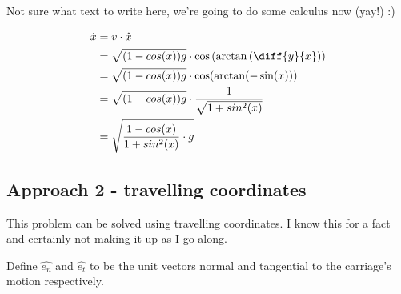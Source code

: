 \documentclass{article}
\begin{document}
Not sure what text to write here, we're going to do some calculus now (yay!) :)

\begin{align}
    \dot{x} &= v \cdot \hat{x}\\
    &= \sqrt{(1-cos(x))g} \cdot \cos \left( \arctan \left( \diff{y}{x} \right) \right)\\
    &= \sqrt{(1-cos(x))g} \cdot \cos (\arctan (-\sin(x)))\\
    &= \sqrt{(1-cos(x))g} \cdot \frac{1}{\sqrt{1+sin^2(x)}}\\
    &= \sqrt{\frac{1-cos(x)}{1+sin^2(x)} \cdot g}\\
\end{align}

\subsection{Approach 2 - travelling coordinates}

This problem can be solved using travelling coordinates. I know this for a fact and certainly not making it up as I go along.

Define $\hat{e_n}$ and $\hat{e_t}$ to be the unit vectors normal and tangential to the carriage's motion respectively.
\end{document}
